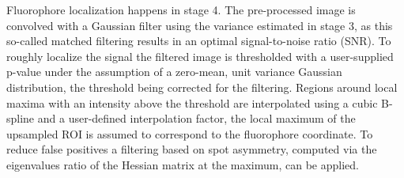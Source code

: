 \documentclass[a4paper,12pt,notitlepage]{report}
\begin{document}
Fluorophore localization happens in stage 4. The pre-processed image is convolved with a Gaussian filter using the variance estimated in stage 3, as this so-called matched filtering results in an optimal signal-to-noise ratio (SNR). To roughly localize the signal the filtered image is thresholded with a user-supplied p-value under the assumption of a zero-mean, unit variance Gaussian distribution, the threshold being corrected for the filtering. Regions around local maxima with an intensity above the threshold are interpolated using a cubic B-spline and a user-defined interpolation factor, the local maximum of the upsampled ROI is assumed to correspond to the fluorophore coordinate. To reduce false positives a filtering based on spot asymmetry, computed via the eigenvalues ratio of the Hessian matrix at the maximum, can be applied.


\end{document}
